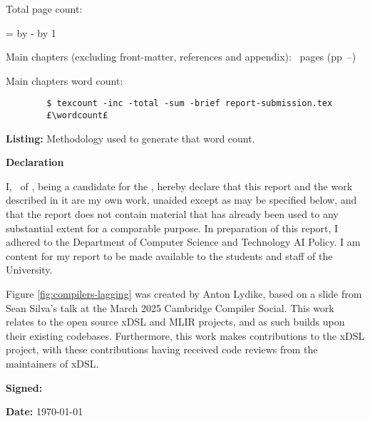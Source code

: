 \begin{sffamily}
Total page count: \pageref{LastPage}

\makeatletter
\@tempcnta=\relax%
\advance\@tempcnta by -%
\advance\@tempcnta by 1%
\xdef\contentpages{\the\@tempcnta}%
\makeatother

Main chapters (excluding front-matter, references and appendix):
\contentpages~pages
(pp~\pageref{firstcontentpage}--\pageref{lastcontentpage})

Main chapters word count: \wordcount

\vspace*{2em}
\begin{code}
    \begin{verbatim}
        $ texcount -inc -total -sum -brief report-submission.tex
        £\wordcount£
    \end{verbatim}
    \captionsetup{textfont=sf}
    \caption*{\textbf{Listing:} Methodology used to generate that word count.}
\end{code}



\vspace{\fill}
\onehalfspacing
\makeatletter
\textbf{\Huge Declaration}
\vspace{40pt}

I, \@author\ of \college, being a candidate for the \course, hereby declare that
this report and the work described in it are my own work, unaided except as may
be specified below, and that the report does not contain material that has
already been used to any substantial extent for a comparable purpose. In
preparation of this report, I adhered to the Department of Computer Science and
Technology AI Policy. I am content for my report to be made available to the
students and staff of the University.

Figure \ref{fig:compilers-lagging} was created by Anton Lydike, based on a slide from Sean Silva's talk at the March 2025 Cambridge Compiler Social. This work relates to the open source xDSL and MLIR projects, and as such builds upon their existing codebases. Furthermore, this work makes contributions to the xDSL project, with these contributions having received code reviews from the maintainers of xDSL.

\bigskip
\textbf{Signed:} \@author

\bigskip
\textbf{Date:} \today
\vspace{\fill}

\makeatother

\end{sffamily}
\onehalfspacing

\fi
